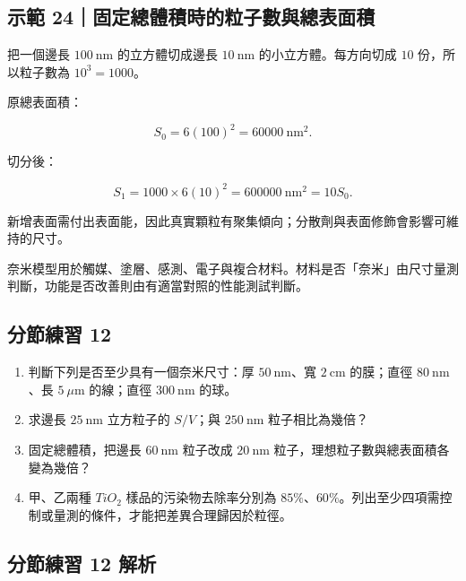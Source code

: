 \documentclass[11pt,a4paper]{article}
\providecommand{\tightlist}{%
  \setlength{\itemsep}{0pt}\setlength{\parskip}{0pt}}
\begin{document}
\begin{HandoutWorkedExample}

\subsection{示範 24｜固定總體積時的粒子數與總表面積}\label{ux793aux7bc4-24ux56faux5b9aux7e3dux9ad4ux7a4dux6642ux7684ux7c92ux5b50ux6578ux8207ux7e3dux8868ux9762ux7a4d}

把一個邊長 \(100\ \mathrm{nm}\) 的立方體切成邊長 \(10\ \mathrm{nm}\) 的小立方體。每方向切成 \(10\) 份，所以粒子數為 \(10^3=1000\)。

原總表面積：

\[
S_0=6(100)^2=60000\ \mathrm{nm^2}.
\]

切分後：

\[
S_1=1000\times6(10)^2=600000\ \mathrm{nm^2}=10S_0.
\]

新增表面需付出表面能，因此真實顆粒有聚集傾向；分散劑與表面修飾會影響可維持的尺寸。

\end{HandoutWorkedExample}

奈米模型用於觸媒、塗層、感測、電子與複合材料。材料是否「奈米」由尺寸量測判斷，功能是否改善則由有適當對照的性能測試判斷。

\subsection{分節練習 12}\label{ux5206ux7bc0ux7df4ux7fd2-12}

\begin{enumerate}
\def\labelenumi{\arabic{enumi}.}
\tightlist
\item
  判斷下列是否至少具有一個奈米尺寸：厚 \(50\ \mathrm{nm}\)、寬 \(2\ \mathrm{cm}\) 的膜；直徑 \(80\ \mathrm{nm}\)、長 \(5\ \mu\mathrm m\) 的線；直徑 \(300\ \mathrm{nm}\) 的球。
\item
  求邊長 \(25\ \mathrm{nm}\) 立方粒子的 \(S/V\)；與 \(250\ \mathrm{nm}\) 粒子相比為幾倍？
\item
  固定總體積，把邊長 \(60\ \mathrm{nm}\) 粒子改成 \(20\ \mathrm{nm}\) 粒子，理想粒子數與總表面積各變為幾倍？
\item
  甲、乙兩種 \(TiO_2\) 樣品的污染物去除率分別為 \(85\%\)、\(60\%\)。列出至少四項需控制或量測的條件，才能把差異合理歸因於粒徑。
\end{enumerate}

\subsection{分節練習 12 解析}\label{ux5206ux7bc0ux7df4ux7fd2-12-ux89e3ux6790}
\end{document}

